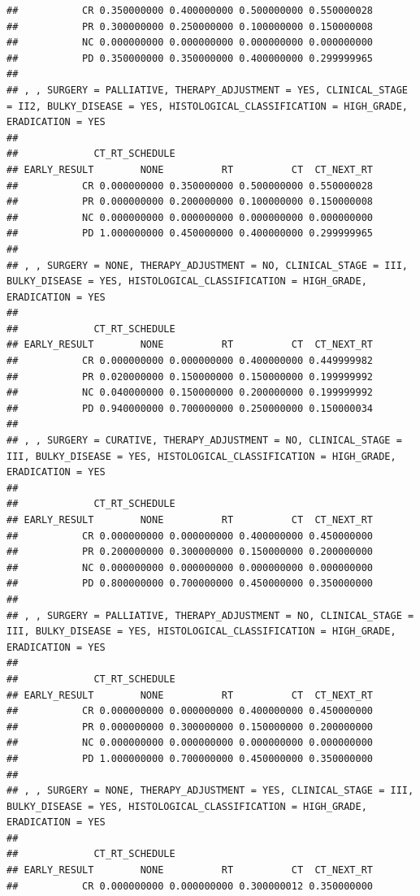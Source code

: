 \documentclass[]{article}
\begin{document}
\begin{verbatim}
##           CR 0.350000000 0.400000000 0.500000000 0.550000028
##           PR 0.300000000 0.250000000 0.100000000 0.150000008
##           NC 0.000000000 0.000000000 0.000000000 0.000000000
##           PD 0.350000000 0.350000000 0.400000000 0.299999965
## 
## , , SURGERY = PALLIATIVE, THERAPY_ADJUSTMENT = YES, CLINICAL_STAGE = II2, BULKY_DISEASE = YES, HISTOLOGICAL_CLASSIFICATION = HIGH_GRADE, ERADICATION = YES
## 
##             CT_RT_SCHEDULE
## EARLY_RESULT        NONE          RT          CT  CT_NEXT_RT
##           CR 0.000000000 0.350000000 0.500000000 0.550000028
##           PR 0.000000000 0.200000000 0.100000000 0.150000008
##           NC 0.000000000 0.000000000 0.000000000 0.000000000
##           PD 1.000000000 0.450000000 0.400000000 0.299999965
## 
## , , SURGERY = NONE, THERAPY_ADJUSTMENT = NO, CLINICAL_STAGE = III, BULKY_DISEASE = YES, HISTOLOGICAL_CLASSIFICATION = HIGH_GRADE, ERADICATION = YES
## 
##             CT_RT_SCHEDULE
## EARLY_RESULT        NONE          RT          CT  CT_NEXT_RT
##           CR 0.000000000 0.000000000 0.400000000 0.449999982
##           PR 0.020000000 0.150000000 0.150000000 0.199999992
##           NC 0.040000000 0.150000000 0.200000000 0.199999992
##           PD 0.940000000 0.700000000 0.250000000 0.150000034
## 
## , , SURGERY = CURATIVE, THERAPY_ADJUSTMENT = NO, CLINICAL_STAGE = III, BULKY_DISEASE = YES, HISTOLOGICAL_CLASSIFICATION = HIGH_GRADE, ERADICATION = YES
## 
##             CT_RT_SCHEDULE
## EARLY_RESULT        NONE          RT          CT  CT_NEXT_RT
##           CR 0.000000000 0.000000000 0.400000000 0.450000000
##           PR 0.200000000 0.300000000 0.150000000 0.200000000
##           NC 0.000000000 0.000000000 0.000000000 0.000000000
##           PD 0.800000000 0.700000000 0.450000000 0.350000000
## 
## , , SURGERY = PALLIATIVE, THERAPY_ADJUSTMENT = NO, CLINICAL_STAGE = III, BULKY_DISEASE = YES, HISTOLOGICAL_CLASSIFICATION = HIGH_GRADE, ERADICATION = YES
## 
##             CT_RT_SCHEDULE
## EARLY_RESULT        NONE          RT          CT  CT_NEXT_RT
##           CR 0.000000000 0.000000000 0.400000000 0.450000000
##           PR 0.000000000 0.300000000 0.150000000 0.200000000
##           NC 0.000000000 0.000000000 0.000000000 0.000000000
##           PD 1.000000000 0.700000000 0.450000000 0.350000000
## 
## , , SURGERY = NONE, THERAPY_ADJUSTMENT = YES, CLINICAL_STAGE = III, BULKY_DISEASE = YES, HISTOLOGICAL_CLASSIFICATION = HIGH_GRADE, ERADICATION = YES
## 
##             CT_RT_SCHEDULE
## EARLY_RESULT        NONE          RT          CT  CT_NEXT_RT
##           CR 0.000000000 0.000000000 0.300000012 0.350000000

\end{verbatim}
\end{document}
